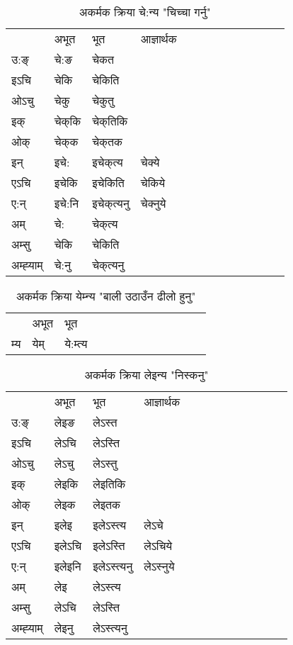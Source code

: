 \begin{table}[H]
\label{ek.vi} \centering
\caption{अकर्मक क्रिया  चे:न्य  "चिच्चा गर्नु"  }
\begin{tabular}{l|l|l|l|l|l|l|l|l|l|l|l|l}  \toprule
&अभूत & भूत & आज्ञार्थक \\ 
उ:ङ्‌ &चे:ङ &चेकत \\ 
इऽचि &चेकि &चेकिति   \\ 
ओऽचु &चेकु &चेकुतु   \\ 
इक् &चेक्‌कि &चेक्‌तिकि   \\ 
ओक् &चेक्‌क &चेक्‌तक   \\ 
इन् & इचे: & इचेक्‌त्य &चेक्ये  \\ 
एऽचि & इचेकि & इचेकिति &चेकिये    \\ 
ए:न् & इचे:नि  & इचेक्‌त्यनु &चेक्‍नुये  \\ 
अम् & चे: & चेक्‌त्य   \\ 
अम्सु & चेकि & चेकिति   \\ 
अम्ह्‍याम् & चे:नु  & चेक्‌त्यनु \\ 
\bottomrule
\end{tabular}
\end{table}


\begin{table}[H]
\label{em.vi} \centering
\caption{अकर्मक क्रिया  येम्‍न्य  "बाली उठाउँन ढीलो हुनु"  }
\begin{tabular}{l|l|l|l|l|l|l|l|l|l|l|l|l}  \toprule
&अभूत & भूत   \\ 
म्य & येम् & ये:म्त्य   \\ 
\bottomrule
\end{tabular}
\end{table}


\begin{table}[H]
\label{en.vi} \centering
\caption{अकर्मक क्रिया  लेइन्य  "निस्कनु"  }
\begin{tabular}{l|l|l|l|l|l|l|l|l|l|l|l|l}  \toprule
&अभूत & भूत & आज्ञार्थक \\ 
उ:ङ्‌ &लेइङ &लेऽस्त \\ 
इऽचि &लेऽचि &लेऽस्ति   \\ 
ओऽचु &लेऽचु &लेऽस्तु   \\ 
इक् &लेइकि &लेइतिकि   \\ 
ओक् &लेइक &लेइतक   \\ 
इन् & इलेइ & इलेऽस्त्य &लेऽचे  \\ 
एऽचि & इलेऽचि & इलेऽस्ति &लेऽचिये    \\ 
ए:न् & इलेइनि  & इलेऽस्त्यनु &लेऽस्‍नुये  \\ 
अम् & लेइ & लेऽस्त्य   \\ 
अम्सु & लेऽचि & लेऽस्ति   \\ 
अम्ह्‍याम् & लेइनु  & लेऽस्त्यनु \\ 
\bottomrule
\end{tabular}
\end{table}


